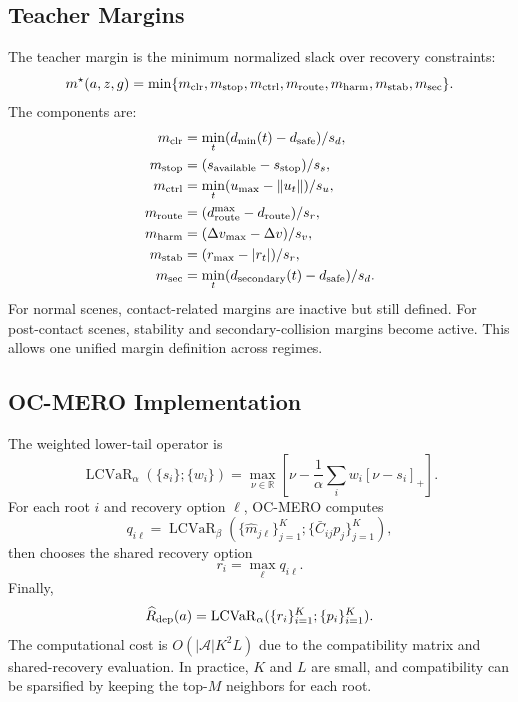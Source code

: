 \documentclass[conference]{IEEEtran}
\begin{document}
\subsection{Teacher Margins}
\label{app:teacher_margins}

The teacher margin is the minimum normalized slack over recovery constraints:
\begin{equation}
    m^\star(a,z,g)
    =
    \min
    \{
        m_{\rm clr},
        m_{\rm stop},
        m_{\rm ctrl},
        m_{\rm route},
        m_{\rm harm},
        m_{\rm stab},
        m_{\rm sec}
    \}.
\end{equation}
The components are:
\begin{align}
    m_{\rm clr} &= \min_t (d_{\rm min}(t)-d_{\rm safe})/s_d, \\
    m_{\rm stop} &= (s_{\rm available}-s_{\rm stop})/s_s, \\
    m_{\rm ctrl} &= \min_t (u_{\max}-\|u_t\|)/s_u, \\
    m_{\rm route} &= (d_{\rm route}^{\max}-d_{\rm route})/s_r, \\
    m_{\rm harm} &= (\Delta v_{\max}-\Delta v)/s_v, \\
    m_{\rm stab} &= (r_{\max}-|r_t|)/s_r, \\
    m_{\rm sec} &= \min_t (d_{\rm secondary}(t)-d_{\rm safe})/s_d.
\end{align}
For normal scenes, contact-related margins are inactive but still defined.  For post-contact scenes, stability and secondary-collision margins become active.  This allows one unified margin definition across regimes.

\subsection{OC-MERO Implementation}
\label{app:ocmero_impl}

The weighted lower-tail operator is
\begin{equation}
    \operatorname{LCVaR}_{\alpha}(\{s_i\};\{w_i\})
    =
    \max_{\nu\in\mathbb{R}}
    \left[
        \nu
        -
        \frac{1}{\alpha}
        \sum_i w_i[\nu-s_i]_+
    \right].
\end{equation}
For each root $i$ and recovery option $\ell$, OC-MERO computes
\begin{equation}
    q_{i\ell}
    =
    \operatorname{LCVaR}_{\beta}
    \left(
        \{\hat m_{j\ell}\}_{j=1}^{K};
        \{\bar C_{ij}p_j\}_{j=1}^{K}
    \right),
\end{equation}
then chooses the shared recovery option
\begin{equation}
    r_i = \max_{\ell} q_{i\ell}.
\end{equation}
Finally,
\begin{equation}
    \widehat R_{\rm dep}(a)
    =
    \operatorname{LCVaR}_{\alpha}
    (
        \{r_i\}_{i=1}^{K};
        \{p_i\}_{i=1}^{K}
    ).
\end{equation}
The computational cost is $O(|\mathcal{A}|K^2L)$ due to the compatibility matrix and shared-recovery evaluation.  In practice, $K$ and $L$ are small, and compatibility can be sparsified by keeping the top-$M$ neighbors for each root.
\end{document}

